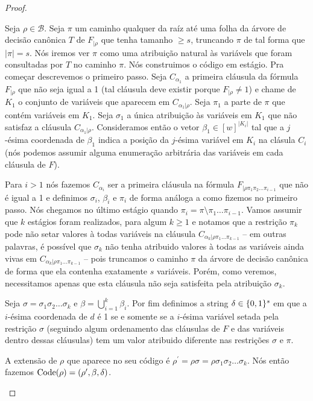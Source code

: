 \begin{proof}
\begin{enumerate}
	Seja $\rho \in \mathcal{B}$. Seja $\pi$ um caminho qualquer da raíz até uma folha da árvore de decisão canônica $T$ de $F_{\lvert \rho}$ que tenha tamanho $\geq s$, truncando $\pi$ de tal forma que $\lvert \pi \rvert = s$. Nós iremos ver $\pi$ como uma atribuição natural às variávels que foram consultadas por $T$ no caminho $\pi$. Nós construimos o código em estágio. Pra começar descrevemos o primeiro passo. Seja $C_{\alpha_{1}}$ a primeira cláusula da fórmula $F_{\lvert \rho}$ que não seja igual a 1 (tal cláusula deve existir porque $F_{\lvert \rho} \neq 1$) e chame de $K_{1}$ o conjunto de variáveis que aparecem em $C_{\alpha_{1} \lvert \rho}$. Seja $\pi_{1}$ a parte de $\pi$ que contém variáveis em $K_{1}$. Seja $\sigma_{1}$ a única atribuição às variáveis em $K_{1}$ que não satisfaz a cláusula $C_{\alpha_{1} \lvert \rho}$. Consideramos então o vetor $\beta_{1} \in [w]^{\lvert K_{i} \rvert}$ tal que a $j$-ésima coordenada de $\beta_{1}$ indica a posição da $j$-ésima variável em $K_{i}$ na clásula $C_{i}$ (nós podemos assumir alguma enumeração arbitrária das variáveis em cada cláusula de $F$).
	
	Para $i > 1$ nós fazemos $C_{\alpha_{i}}$ ser a primeira cláusula na fórmula $F_{\lvert \rho\pi_{1}\pi_{2}\dots\pi_{i - 1}}$ que não é igual a 1 e definimos $\sigma_{i}$, $\beta_{i}$ e $\pi_{i}$ de forma análoga a como fizemos no primeiro passo. Nós chegamos no último estágio quando $\pi_{i} = \pi \setminus \pi_{1}\dots\pi_{i - 1}$. Vamos assumir que $k$ estágios foram realizados, para algum $k \geq 1$ e notamos que a restrição $\pi_{k}$ pode não setar valores à todas variáveis na cláusula $C_{\alpha_{k} \lvert \rho\pi_{1}\dots\pi_{k - 1}}$ -- em outras palavras, é possível que $\sigma_{k}$ não tenha atribuido valores à todas as variáveis ainda vivas em $C_{\alpha_{k} \lvert \rho\pi_{1}\dots\pi_{k - 1}}$ -- pois truncamos o caminho $\pi$ da árvore de decisão canônica de forma que ela contenha exatamente $s$ variáveis. Porém, como veremos, necessitamos apenas que esta cláusula não seja satisfeita pela atribuição $\sigma_{k}$.
	
	Seja $\sigma = \sigma_{1}\sigma_{2}\dots\sigma_{k}$ e $\beta = \bigcup_{i = 1}^{k} \beta_{i}$. Por fim definimos a string $\delta \in \{0, 1\}^{s}$ em que a $i$-ésima coordenada de $d$ é 1 se e somente se a $i$-ésima variável setada pela restrição $\sigma$ (seguindo algum ordenamento das cláusulas de $F$ e das variáveis dentro dessas cláusulas) tem um valor atribuido diferente nas restrições $\sigma$ e $\pi$.
	
	A extensão de $\rho$ que aparece no seu código é $\rho^{\prime} = \rho\sigma = \rho\sigma_{1}\sigma_{2}\dots\sigma_{k}$. Nós então fazemos $\text{Code}(\rho) = (\rho^{\prime}, \beta, \delta)$.


\end{enumerate}
\end{proof}
